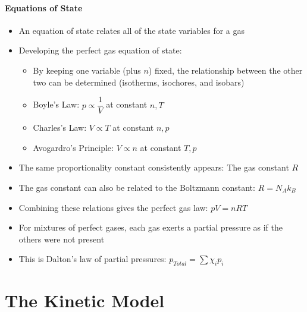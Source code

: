 \documentclass[12pt, openany, letterpaper]{memoir}
\begin{document}
\paragraph{Equations of State}
\begin{itemize}
	\item An equation of state relates all of the state variables for a gas
	\item Developing the perfect gas equation of state:
	\begin{itemize}
		\item By keeping one variable (plus $n$) fixed, the relationship between the other two can be determined (isotherms, isochores, and isobars)
		\item Boyle's Law: $p\propto \dfrac{1}{V}$ at constant $n,T$
		\item Charles's Law: $V\propto T$ at constant $n,p$
		\item Avogardro's Principle: $V\propto n$ at constant $T,p$
	\end{itemize}
	\item The same proportionality constant consistently appears: The gas constant $R$
	\item The gas constant can also be related to the Boltzmann constant: $R=N_A k_B$
	\item Combining these relations gives the perfect gas law: $pV=nRT$
	\item For mixtures of perfect gases, each gas exerts a partial pressure as if the others were not present
	\item This is Dalton's law of partial pressures: ${p_{Total} = \sum{\chi_ip_i}}$
	
\end{itemize}

\section{The Kinetic Model}
\end{document}
